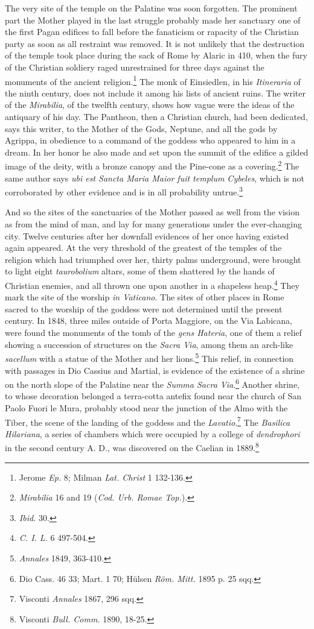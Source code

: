 \documentclass[a4paper, 11pt, oneside, polutonikogreek, english]{article}
\begin{document}
The very site of the temple on the Palatine was soon forgotten. The prominent part the Mother played in the last struggle probably made her sanctuary one of the first Pagan edifices to fall before the fanaticism or rapacity of the Christian party as soon as all restraint was removed. It is not unlikely that the destruction of the temple took place during the sack of Rome by Alaric in 410, when the fury of the Christian soldiery raged unrestrained for three days against the monuments of the ancient religion.\footnote{Jerome \emph{Ep.} 8; Milman \emph{Lat. Christ} 1 132-136.} The monk of Einsiedlen, in his \emph{Itineraria} of the ninth century, does not include it among his lists of ancient ruins. The writer of the \emph{Mirabilia}, of the twelfth century, shows how vague were the ideas of the antiquary of his day. The Pantheon, then a Christian church, had been dedicated, says this writer, to the Mother of the Gods, Neptune, and all the gods by Agrippa, in obedience to a command of the goddess who appeared to him in a dream. In her honor he also made and set upon the summit of the edifice a gilded image of the deity, with a bronze canopy and the Pine-cone as a covering.\footnote{\emph{Mirabilia} 16 and 19 (\emph{Cod. Urb. Romae Top.}).} The same author says \emph{ubi est Sancta Maria Maior fuit templum Cybeles}, which is not corroborated by other evidence and is in all probability untrue.\footnote{\emph{Ibid.} 30.}

And so the sites of the sanctuaries of the Mother passed as well from the vision as from the mind of man, and lay for many generations under the ever-changing city. Twelve centuries after her downfall evidences of her once having existed again appeared. At the very threshold of the greatest of the temples of the religion which had triumphed over her, thirty palms underground, were brought to light eight \emph{taurobolium} altars, some of them shattered by the hands of Christian enemies, and all thrown one upon another in a shapeless heap.\footnote{\emph{C. I. L.} 6 497-504.} They mark the site of the worship \emph{in Vaticano}. The sites of other places in Rome sacred to the worship of the goddess were not determined until the present century. In 1848, three miles outside of Porta Maggiore, on the Via Labicana, were found the monuments of the tomb of the \emph{gens Hateria}, one of them a relief showing a succession of structures on the \emph{Sacra Via}, among them an arch-like \emph{sacellum} with a statue of the Mother and her lions.\footnote{\emph{Annales} 1849, 363-410.} This relief, in connection with passages in Dio Cassius and Martial, is evidence of the existence of a shrine on the north slope of the Palatine near the \emph{Summa Sacra Via}.\footnote{Dio Cass. 46 33; Mart. 1 70; Hülsen \emph{Röm. Mitt.} 1895 p. 25 sqq.} Another shrine, to whose decoration belonged a terra-cotta antefix found near the church of San Paolo Fuori le Mura, probably stood near the junction of the Almo with the Tiber, the scene of the landing of the goddess and the \emph{Lavatio}.\footnote{Visconti \emph{Annales} 1867, 296 sqq.} The \emph{Basilica Hilariana}, a series of chambers which were occupied by a college of \emph{dendrophori} in the second century A. D., was discovered on the Caelian in 1889.\footnote{Visconti \emph{Bull. Comm.} 1890, 18-25.}
\end{document}
